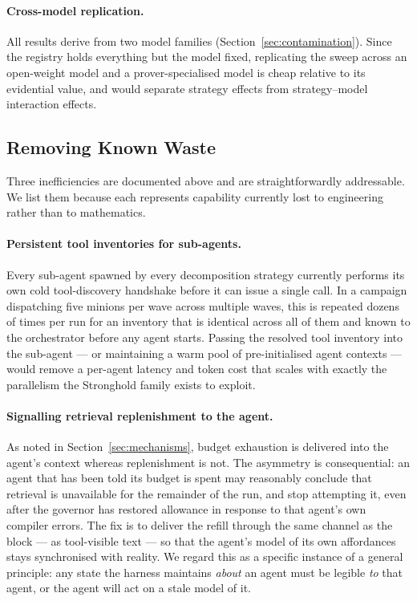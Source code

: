 \documentclass[12pt, a4paper]{article}
\begin{document}
\paragraph{Cross-model replication.} All results derive from two model
families (Section~\ref{sec:contamination}). Since the registry holds
everything but the model fixed, replicating the sweep across an open-weight
model and a prover-specialised model is cheap relative to its evidential
value, and would separate strategy effects from strategy--model interaction
effects.

\subsection{Removing Known Waste}

Three inefficiencies are documented above and are straightforwardly
addressable. We list them because each represents capability currently lost
to engineering rather than to mathematics.

\paragraph{Persistent tool inventories for sub-agents.} Every sub-agent
spawned by every decomposition strategy currently performs its own cold
tool-discovery handshake before it can issue a single call. In a campaign
dispatching five minions per wave across multiple waves, this is repeated
dozens of times per run for an inventory that is identical across all of
them and known to the orchestrator before any agent starts. Passing the
resolved tool inventory into the sub-agent --- or maintaining a warm pool of
pre-initialised agent contexts --- would remove a per-agent latency and token
cost that scales with exactly the parallelism the Stronghold family exists
to exploit.

\paragraph{Signalling retrieval replenishment to the agent.} As noted in
Section~\ref{sec:mechanisms}, budget exhaustion is delivered into the agent's
context whereas replenishment is not. The asymmetry is consequential: an
agent that has been told its budget is spent may reasonably conclude that
retrieval is unavailable for the remainder of the run, and stop attempting
it, even after the governor has restored allowance in response to that
agent's own compiler errors. The fix is to deliver the refill through the
same channel as the block --- as tool-visible text --- so that the agent's
model of its own affordances stays synchronised with reality. We regard
this as a specific instance of a general principle: any state the harness
maintains \emph{about} an agent must be legible \emph{to} that agent, or the
agent will act on a stale model of it.
\end{document}
